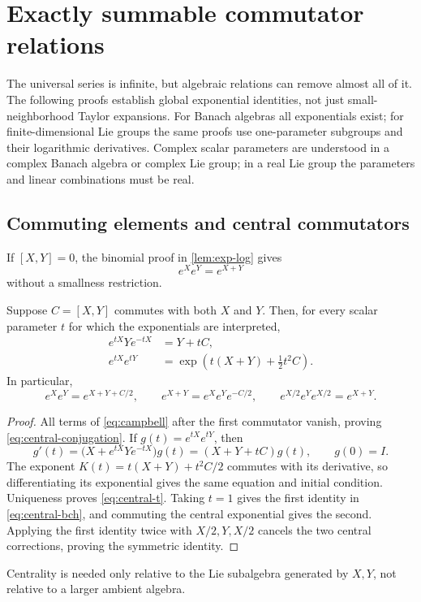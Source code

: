 \section{Exactly summable commutator relations}\label{sec:special}
The universal series is infinite, but algebraic relations can remove almost all of it. The following proofs establish global exponential identities, not just small-neighborhood Taylor expansions. For Banach algebras all exponentials exist; for finite-dimensional Lie groups the same proofs use one-parameter subgroups and their logarithmic derivatives. Complex scalar parameters are understood in a complex Banach algebra or complex Lie group; in a real Lie group the parameters and linear combinations must be real.

\subsection{Commuting elements and central commutators}
If $[X,Y]=0$, the binomial proof in \cref{lem:exp-log} gives
\begin{equation}\label{eq:commuting}
 e^Xe^Y=e^{X+Y}
\end{equation}
without a smallness restriction.

\begin{theorem}\label{thm:central}
Suppose $C=[X,Y]$ commutes with both $X$ and $Y$. Then, for every scalar parameter $t$ for which the exponentials are interpreted,
\begin{align}
 e^{tX}Ye^{-tX}&=Y+tC,\label{eq:central-conjugation}\\
 e^{tX}e^{tY}&=\exp\!\left(t(X+Y)+\tfrac12t^2C\right).\label{eq:central-t}
\end{align}
In particular,
\begin{equation}\label{eq:central-bch}
 e^Xe^Y=e^{X+Y+C/2},\qquad
 e^{X+Y}=e^Xe^Ye^{-C/2},\qquad
 e^{X/2}e^Ye^{X/2}=e^{X+Y}.
\end{equation}
\end{theorem}
\begin{proof}
All terms of \cref{eq:campbell} after the first commutator vanish, proving \cref{eq:central-conjugation}. If $g(t)=e^{tX}e^{tY}$, then
\begin{equation}\label{eq:central-ode}
 g'(t)=\bigl(X+e^{tX}Ye^{-tX}\bigr)g(t)
       =(X+Y+tC)g(t),\qquad g(0)=I.
\end{equation}
The exponent $K(t)=t(X+Y)+t^2C/2$ commutes with its derivative, so differentiating its exponential gives the same equation and initial condition. Uniqueness proves \cref{eq:central-t}. Taking $t=1$ gives the first identity in \cref{eq:central-bch}, and commuting the central exponential gives the second. Applying the first identity twice with $X/2,Y,X/2$ cancels the two central corrections, proving the symmetric identity.
\end{proof}
Centrality is needed only relative to the Lie subalgebra generated by $X,Y$, not relative to a larger ambient algebra.

